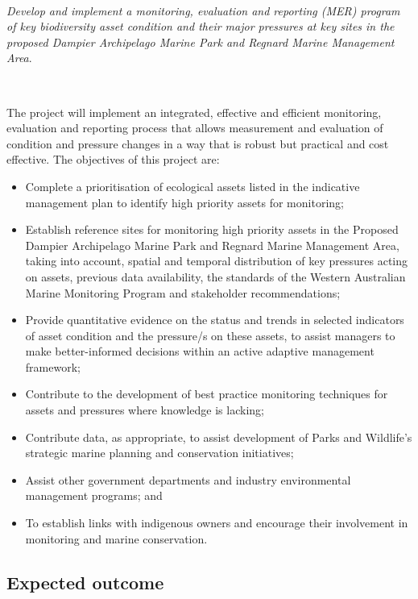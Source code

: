 \documentclass[version=last,
    paper=a4,                               %
    10pt,                                   %
    dvipsnames,
    oneside,                              %
    headings=openany,                       %
    open=any,
    BCOR=7mm,                               %
    DIV=15,     %
]{scrbook}
\providecommand{\tightlist}{\setlength{\itemsep}{0pt}\setlength{\parskip}{0pt}}
\begin{document}
~

\emph{Develop and implement a monitoring, evaluation and reporting (MER)
program of key biodiversity asset condition and their major pressures at
key sites in the proposed Dampier Archipelago Marine Park and Regnard
Marine Management Area}.

~

The project will implement an integrated, effective and efficient
monitoring, evaluation and reporting process that allows measurement and
evaluation of condition and pressure changes in a way that is robust but
practical and cost effective. The objectives of this project are:

\begin{itemize}
\tightlist
\item
  Complete a prioritisation of ecological assets listed in the
  indicative management plan to identify high priority assets for
  monitoring;
\item
  Establish reference sites for monitoring high priority assets in the
  Proposed Dampier Archipelago Marine Park and Regnard Marine Management
  Area, taking into account, spatial and temporal distribution of key
  pressures acting on assets, previous data availability, the standards
  of the Western Australian Marine Monitoring Program and stakeholder
  recommendations;
\item
  Provide quantitative evidence on the status and trends in selected
  indicators of asset condition and the pressure/s on these assets, to
  assist managers to make better-informed decisions within an active
  adaptive management framework;
\item
  Contribute to the development of best practice monitoring techniques
  for assets and pressures where knowledge is lacking;
\item
  Contribute data, as appropriate, to assist development of Parks and
  Wildlife's strategic marine planning and conservation initiatives;
\item
  Assist other government departments and industry environmental
  management programs; and
\item
  To establish links with indigenous owners and encourage their
  involvement in monitoring and marine conservation.
\end{itemize}




\subsection*{Expected outcome}
\end{document}
